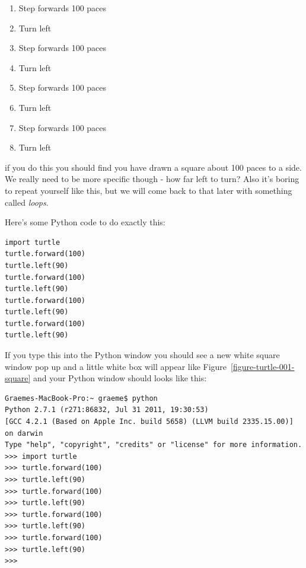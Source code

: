 \documentclass[a4paper, 11pt]{book}
\begin{document}
\begin{enumerate}
\item{Step forwards 100 paces}
\item{Turn left}
\item{Step forwards 100 paces}
\item{Turn left}
\item{Step forwards 100 paces}
\item{Turn left}
\item{Step forwards 100 paces}
\item{Turn left}
\end{enumerate}

\noindent
if you do this you should find you have drawn a square about 100 paces to a side. We really need to be more specific though - how far left to turn? Also it's boring to repeat yourself like this, but we will come back to that later with something called \emph{loops}. 

Here's some Python code to do exactly this:

{\small
\begin{verbatim}
import turtle
turtle.forward(100)
turtle.left(90)
turtle.forward(100)
turtle.left(90)
turtle.forward(100)
turtle.left(90)
turtle.forward(100)
turtle.left(90)
\end{verbatim}
}

\noindent
If you type this into the Python window you should see a new white
square window pop up and a little white box will appear like
Figure~\ref{figure-turtle-001-square} and your Python window should looks like this:

{\small
\begin{verbatim}
Graemes-MacBook-Pro:~ graeme$ python
Python 2.7.1 (r271:86832, Jul 31 2011, 19:30:53) 
[GCC 4.2.1 (Based on Apple Inc. build 5658) (LLVM build 2335.15.00)] on darwin
Type "help", "copyright", "credits" or "license" for more information.
>>> import turtle
>>> turtle.forward(100)
>>> turtle.left(90)
>>> turtle.forward(100)
>>> turtle.left(90)
>>> turtle.forward(100)
>>> turtle.left(90)
>>> turtle.forward(100)
>>> turtle.left(90)
>>> 
\end{verbatim}
}
\end{document}
